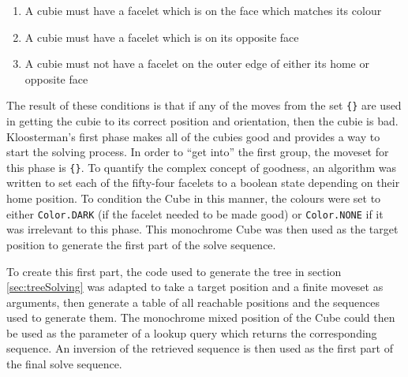\documentclass{report}
\newcommand{\moveset}[1]{\uppercase{\texttt{\{\formatmoves{#1}\}}}}
\begin{document}
	\begin{enumerate}
		\item A cubie must have a facelet which is on the face which matches its colour
		\item A cubie must have a facelet which is on its opposite face
		\item A cubie must not have a facelet on the outer edge of either its home or opposite face
	\end{enumerate}

	The result of these conditions is that if any of the moves from the set \moveset{u.u'd.d'} are used in getting the cubie to its correct position and orientation, then the cubie is bad. Kloosterman's first phase makes all of the cubies good and provides a way to start the solving process. In order to \enquote{get into} the first group, the moveset for this phase is \moveset{u'd'l'r'f'b'}. To quantify the complex concept of goodness, an algorithm was written to set each of the fifty-four facelets to a boolean state depending on their home position. To condition the Cube in this manner, the colours were set to either \lstinline|Color.DARK| (if the facelet needed to be made good) or \lstinline|Color.NONE| if it was irrelevant to this phase. This monochrome Cube was then used as the target position to generate the first part of the solve sequence.
	
	To create this first part, the code used to generate the tree in section \ref{sec:treeSolving} was adapted to take a target position and a finite moveset as arguments, then generate a table of all reachable positions and the sequences used to generate them. The monochrome mixed position of the Cube could then be used as the parameter of a lookup query which returns the corresponding sequence. An inversion of the retrieved sequence is then used as the first part of the final solve sequence.
	
\end{document}

